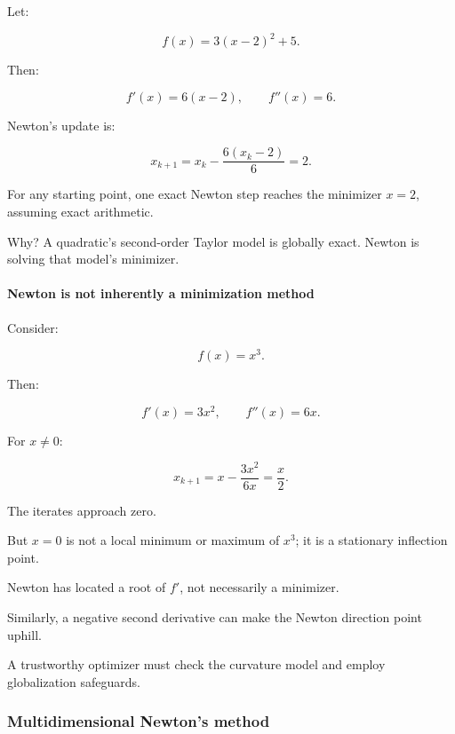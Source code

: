 \hypertarget{02-foundations-ii-ch026-quadratic-example}{}

Let:

\[
f(x)=3(x-2)^2+5.
\]

Then:

\[
f'(x)=6(x-2), \qquad f''(x)=6.
\]

Newton's update is:

\[
x_{k+1} = x_k-\frac{6(x_k-2)}6 =2.
\]

For any starting point, one exact Newton step reaches the minimizer \(x=2\), assuming exact arithmetic.

Why? A quadratic's second-order Taylor model is globally exact. Newton is solving that model's minimizer.

\paragraph{Newton is not inherently a minimization method}\label{02-foundations-ii-ch026-newton-is-not-inherently-a-minimization-method}

\hypertarget{02-foundations-ii-ch026-newton-is-not-inherently-a-minimization-method}{}

Consider:

\[
f(x)=x^3.
\]

Then:

\[
f'(x)=3x^2,\qquad f''(x)=6x.
\]

For \(x\ne0\):

\[
x_{k+1} = x-\frac{3x^2}{6x} =\frac x2.
\]

The iterates approach zero.

But \(x=0\) is not a local minimum or maximum of \(x^3\); it is a stationary inflection point.

Newton has located a root of \(f'\), not necessarily a minimizer.

Similarly, a negative second derivative can make the Newton direction point uphill.

A trustworthy optimizer must check the curvature model and employ globalization safeguards.

\subsubsection{Multidimensional Newton's method}\label{02-foundations-ii-ch026-multidimensional-newtons-method}

\hypertarget{02-foundations-ii-ch026-multidimensional-newtons-method}{}

